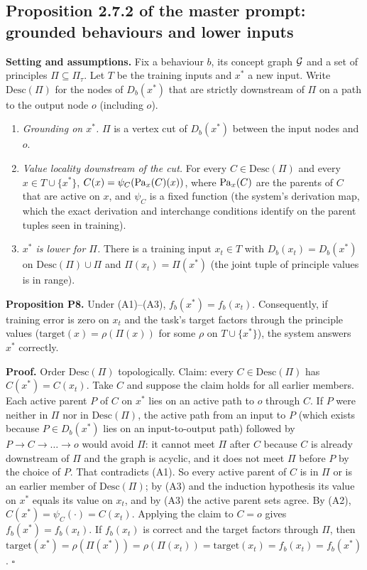 \subsection{Proposition 2.7.2 of the master prompt: grounded behaviours and lower inputs}
\label{proof:P8}
\textbf{Setting and assumptions.} Fix a behaviour $b$, its concept graph
$\mathcal{G}$ and a set of principles $\Pi\subseteq\Pi_\tau$. Let $T$ be the training
inputs and $x^\ast$ a new input. Write $\mathrm{Desc}(\Pi)$ for the nodes of
$D_b(x^\ast)$ that are strictly downstream of $\Pi$ on a path to the output
node $o$ (including $o$).
\begin{enumerate}[label=(A\arabic*)]
\item \emph{Grounding on $x^\ast$.} $\Pi$ is a vertex cut of $D_b(x^\ast)$
between the input nodes and $o$.
\item \emph{Value locality downstream of the cut.} For every
$C\in\mathrm{Desc}(\Pi)$ and every $x\in T\cup\{x^\ast\}$,
$C(x)=\psi_C(\mathrm{Pa}_{x}(C)(x))$, where $\mathrm{Pa}_x(C)$ are the parents of $C$ that are
active on $x$, and $\psi_C$ is a fixed function (the system's derivation map,
which the exact derivation and interchange conditions identify on the
parent tuples seen in training).
\item \emph{$x^\ast$ is lower for $\Pi$.} There is a training input
$x_t\in T$ with $D_b(x_t)=D_b(x^\ast)$ on $\mathrm{Desc}(\Pi)\cup\Pi$ and
$\Pi(x_t)=\Pi(x^\ast)$ (the joint tuple of principle values is in range).
\end{enumerate}

\textbf{Proposition P8.} Under (A1)--(A3), $f_b(x^\ast)=f_b(x_t)$. Consequently, if
training error is zero on $x_t$ and the task's target factors through the
principle values ($\mathrm{target}(x)=\rho(\Pi(x))$ for some $\rho$ on
$T\cup\{x^\ast\}$), the system answers $x^\ast$ correctly.

\textbf{Proof.} Order $\mathrm{Desc}(\Pi)$ topologically. Claim: every
$C\in\mathrm{Desc}(\Pi)$ has $C(x^\ast)=C(x_t)$. Take $C$ and suppose the
claim holds for all earlier members. Each active parent $P$ of $C$ on $x^\ast$
lies on an active path to $o$ through $C$. If $P$ were neither in $\Pi$ nor in
$\mathrm{Desc}(\Pi)$, the active path from an input to $P$ (which exists
because $P\in D_b(x^\ast)$ lies on an input-to-output path) followed by
$P\to C\to\dots\to o$ would avoid $\Pi$: it cannot meet $\Pi$ after $C$
because $C$ is already downstream of $\Pi$ and the graph is acyclic, and it
does not meet $\Pi$ before $P$ by the choice of $P$. That contradicts (A1).
So every active parent of $C$ is in $\Pi$ or is an earlier member of
$\mathrm{Desc}(\Pi)$; by (A3) and the induction hypothesis its value on
$x^\ast$ equals its value on $x_t$, and by (A3) the active parent sets
agree. By (A2), $C(x^\ast)=\psi_C(\cdot)=C(x_t)$. Applying the claim to
$C=o$ gives $f_b(x^\ast)=f_b(x_t)$. If $f_b(x_t)$ is correct and the target
factors through $\Pi$, then $\mathrm{target}(x^\ast)=\rho(\Pi(x^\ast))=
\rho(\Pi(x_t))=\mathrm{target}(x_t)=f_b(x_t)=f_b(x^\ast)$. \hfill$\square$

